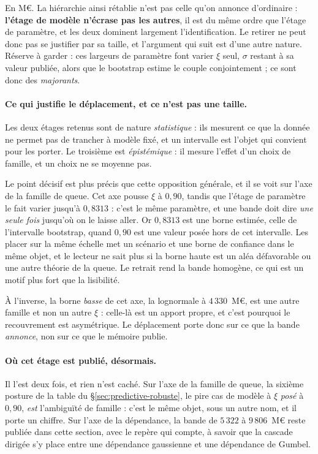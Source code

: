 \vspace{4pt}
\noindent En M\euro. La hiérarchie ainsi rétablie n'est pas celle qu'on annonce d'ordinaire :
\textbf{l'étage de modèle n'écrase pas les autres}, il est du même ordre que l'étage de paramètre,
et les deux dominent largement l'identification. Le retirer ne peut donc pas se justifier par sa
taille, et l'argument qui suit est d'une autre nature. Réserve à garder : ces largeurs de
paramètre font varier $\xi$ seul, $\sigma$ restant à sa valeur publiée, alors que le bootstrap
estime le couple conjointement ; ce sont donc des \emph{majorants}.

\paragraph{Ce qui justifie le déplacement, et ce n'est pas une taille.} Les deux étages retenus
sont de nature \emph{statistique} : ils mesurent ce que la donnée ne permet pas de trancher à
modèle fixé, et un intervalle est l'objet qui convient pour les porter. Le troisième est
\emph{épistémique} : il mesure l'effet d'un choix de famille, et un choix ne se moyenne pas.

Le point décisif est plus précis que cette opposition générale, et il se voit sur l'axe de la
famille de queue. Cet axe pousse $\xi$ à $0{,}90$, tandis que l'étage de paramètre le fait varier
jusqu'à $0{,}8313$ : c'est le même paramètre, et une bande doit dire \emph{une seule
fois} jusqu'où on le laisse aller. Or $0{,}8313$ est une borne estimée, celle de
l'intervalle bootstrap, quand $0{,}90$ est une valeur posée hors de cet intervalle. Les
placer sur la même échelle met un scénario et une borne de confiance dans le même objet, et le
lecteur ne sait plus si la borne haute est un aléa défavorable ou une autre théorie de la queue.
Le retrait rend la bande homogène, ce qui est un motif plus fort que la lisibilité.

À l'inverse, la borne \emph{basse} de cet axe, la lognormale à $4\,330$~M\euro, est une autre
famille et non un autre $\xi$ : celle-là est un apport propre, et c'est pourquoi le
recouvrement est asymétrique. Le déplacement porte donc sur ce que la bande \emph{annonce},
non sur ce que le mémoire publie.

\paragraph{Où cet étage est publié, désormais.} Il l'est deux fois, et rien n'est caché. Sur
l'axe de la famille de queue, la sixième posture de la table du
\S\ref{sec:predictive-robuste}, le pire cas de modèle à $\xi$ \emph{posé} à $0{,}90$, \emph{est}
l'ambiguïté de famille : c'est le même objet, sous un autre nom, et il porte un chiffre.
Sur l'axe de la dépendance, la bande de $5\,322$ à $9\,806$~M\euro{} reste publiée dans cette
section, avec le repère qui compte, à savoir que la cascade dirigée s'y place entre une
dépendance gaussienne et une dépendance de Gumbel.


